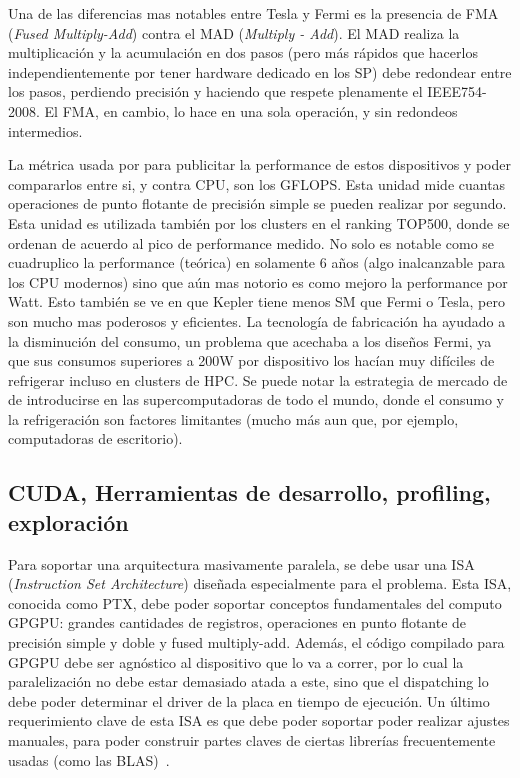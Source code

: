 Una de las diferencias mas notables entre Tesla y Fermi es la presencia de FMA (\textit{Fused Multiply-Add})
contra el MAD (\textit{Multiply - Add}). El MAD realiza la multiplicaci\'on y la acumulaci\'on
en dos pasos (pero m\'as r\'apidos que hacerlos independientemente por tener hardware dedicado en los SP)
debe redondear entre los pasos, perdiendo precisi\'on y haciendo que respete plenamente el IEEE754-2008. El FMA,
en cambio, lo hace en una sola operaci\'on, y sin redondeos intermedios.

La m\'etrica usada por \nvidia{} para publicitar la performance de estos dispositivos y poder
compararlos entre si, y contra CPU, son los GFLOPS. Esta unidad mide cuantas operaciones de punto
flotante de precisi\'on simple se pueden realizar por segundo. Esta unidad es utilizada tambi\'en
por los clusters en el ranking TOP500, donde se ordenan de acuerdo al pico de performance medido. No solo
es notable como se cuadruplico la performance (te\'orica) en solamente 6 a\~nos (algo inalcanzable para
los CPU modernos) sino que a\'un mas notorio es como mejoro la performance por Watt. Esto
tambi\'en se ve en que Kepler tiene menos SM que Fermi o Tesla, pero son mucho mas poderosos y
eficientes. La tecnolog\'ia de fabricaci\'on ha ayudado a la disminuci\'on del consumo, un
problema que acechaba a los dise\~nos Fermi, ya que sus consumos superiores a 200W por
dispositivo los hac\'ian muy dif\'iciles de refrigerar incluso en clusters de HPC. Se puede
notar la estrategia de mercado de \nvidia{} de introducirse en las supercomputadoras de todo
el mundo, donde el consumo y la refrigeraci\'on son factores limitantes (mucho m\'as aun que,
por ejemplo, computadoras de escritorio).

\subsection{CUDA, Herramientas de desarrollo, profiling, exploraci\'on}

Para soportar una arquitectura masivamente paralela, se debe usar una ISA
(\textit{Instruction Set Architecture}) dise\~nada especialmente para el problema. Esta ISA, conocida como PTX,
debe poder soportar conceptos fundamentales del computo GPGPU: grandes cantidades de registros,
operaciones en punto flotante de precisi\'on simple y doble y fused multiply-add. Adem\'as,
el c\'odigo compilado para GPGPU debe ser agn\'ostico al dispositivo que lo va a correr, por
lo cual la paralelizaci\'on no debe estar demasiado atada a este, sino que el dispatching
lo debe poder determinar el driver de la placa en tiempo de ejecuci\'on.  Un \'ultimo
requerimiento clave de esta ISA es que debe poder soportar poder realizar ajustes manuales,
para poder construir partes claves de ciertas librer\'ias frecuentemente usadas (como las BLAS)~\cite{NvidiaFermi}.

